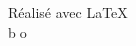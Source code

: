 \documentclass[a4paper,12pt,openright]{memoir}
\begin{document}
\vspace{2cm}
\begin{center}
\LARGE{\aldineleft}
\end{center}








\vfill




\begin{center}
\baselineskip=60pt 

\vspace*{12.5cm}
Réalisé avec \LaTeX
\\
\vspace*{1.5cm}
{\lb \LARGE \textcircled {bo}}

\end{center}
\end{document}
